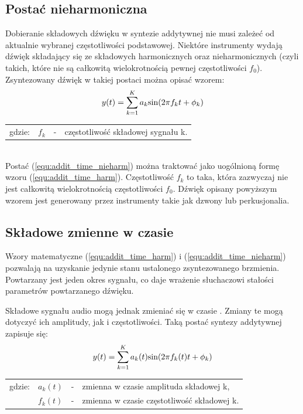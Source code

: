 \subsection{Postać nieharmoniczna} \label{pos_nieharm}
Dobieranie składowych dźwięku w syntezie addytywnej nie musi zależeć od aktualnie wybranej częstotliwości podstawowej. Niektóre instrumenty wydają dźwięk składający się ze składowych harmonicznych oraz nieharmonicznych (czyli takich, które nie są całkowitą wielokrotnością pewnej częstotliwości $f_{0}$). Zsyntezowany dźwięk w takiej postaci można opisać wzorem:
\begin{equation} \label{equ:addit_time_nieharm}
y(t) = \sum_{k=1}^{K} a_{k}\text{sin}(2\pi f_{k}t + \phi_{k})  \\  
\end{equation}
\begin{tabular}{ l l l l}
	gdzie: 	&	$f_{k}$ & - &  częstotliwość składowej sygnału k. \\
\end{tabular} \\

Postać (\ref{equ:addit_time_nieharm}) można traktować jako uogólnioną formę wzoru (\ref{equ:addit_time_harm}). Częstotliwość $f_k$ to taka, która zazwyczaj nie jest całkowitą wielokrotnością częstotliwości $f_0$. Dźwięk opisany powyższym wzorem jest generowany przez instrumenty takie jak dzwony lub perkusjonalia.

\subsection{Składowe zmienne w czasie}
Wzory matematyczne (\ref{equ:addit_time_harm}) i (\ref{equ:addit_time_nieharm}) pozwalają na uzyskanie jedynie stanu ustalonego zsyntezowanego brzmienia. Powtarzany jest jeden okres sygnału, co daje wrażenie słuchaczowi stałości parametrów powtarzanego dźwięku.

Składowe sygnału audio mogą jednak zmieniać się w czasie \cite{add_time_varying}. Zmiany te mogą dotyczyć ich amplitudy, jak i częstotliwości.
Taką postać syntezy addytywnej zapisuje się:
\begin{equation} \label{equ:addit_time_zmienne}
y(t) = \sum_{k=1}^{K} a_{k}(t)\text{sin}(2\pi f_{k}(t)t + \phi_{k})  \\  
\end{equation}
\begin{tabular}{ l l l l}
	gdzie: & $a_{k}(t)$ &  - & zmienna w czasie amplituda składowej k, \\
	&	$f_{k}(t)$ & - &  zmienna w czasie częstotliwość składowej k. \\
\end{tabular} \\

